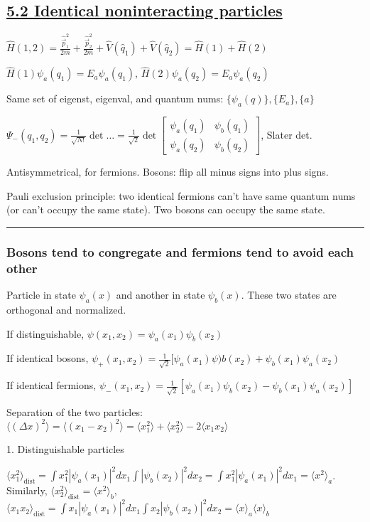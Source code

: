 \subsection{\underline{5.2 Identical noninteracting particles}}

$\widehat{H}(1, 2) = \frac{\widehat{\vec{p}}_1^2}{2m} + \frac{\widehat{\vec{p}}_2^2}{2m} + \widehat{V}(\widehat{q}_1) + \widehat{V}(\widehat{q}_2) = \widehat{H}(1) + \widehat{H}(2)$

$\widehat{H}(1) \psi_a (q_1) = E_a \psi_a(q_1)$, $\widehat{H}(2) \psi_a (q_2) = E_a \psi_a (q_2)$

Same set of eigenst, eigenval, and quantum nums: $\{\psi_a(q)\}, \{E_a\}, \{a \}$

$\Psi_{-}(q_1, q_2) = \frac{1}{\sqrt{N!}} \det \dots =\frac{1}{\sqrt{2}} \det \begin{bmatrix} \psi_a(q_1) & \psi_b(q_1) \\ \psi_a(q_2) & \psi_b(q_2) \end{bmatrix}$, Slater det.

Antisymmetrical, for fermions. Bosons: flip all minus signs into plus signs.

Pauli exclusion principle: two identical fermions can't have same quantum nums (or can't occupy the same state). Two bosons can occupy the same state.

\hrule height 0.07pt

\subsubsection{Bosons tend to congregate and fermions tend to avoid each other}

Particle in state $\psi_a(x)$ and another in state $\psi_b(x)$. These two states are orthogonal and normalized.

If distinguishable, $\psi(x_1, x_2) = \psi_a(x_1) \psi_b(x_2)$

If identical bosons, $\psi_{+} (x_1, x_2) = \frac{1}{\sqrt{2}} [\psi_a(x_1) \psi)b(x_2) + \psi_b(x_1) \psi_a(x_2)$

If identical fermions, $\psi_{-}(x_1, x_2) = \frac{1}{\sqrt{2}} [\psi_a(x_1) \psi_b(x_2) - \psi_b(x_1) \psi_a(x_2)]$

Separation of the two particles: $\langle (\Delta x)^2 \rangle = \langle (x_1 - x_2)^2 \rangle = \langle x_1^2 \rangle + \langle x_2^2 \rangle - 2 \langle x_1 x_2 \rangle$

1. Distinguishable particles

$\langle x_1^2 \rangle_{\textrm{dist}} = \int x_1^2 | \psi_a(x_1)|^2 dx_1 \int | \psi_b(x_2)|^2 dx_2 = \int x_1^2 | \psi_a (x_1)|^2 dx_1 = \langle x^2 \rangle_a$. Similarly, $\langle x_2^2 \rangle_{\textrm{dist}} = \langle x^2 \rangle_b$, $\langle x_1 x_2 \rangle_{\textrm{dist}} = \int x_1 | \psi_a(x_1)|^2 dx_1 \int x_2 | \psi_b (x_2)|^2 dx_2 = \langle x \rangle_a \langle x \rangle_b$

